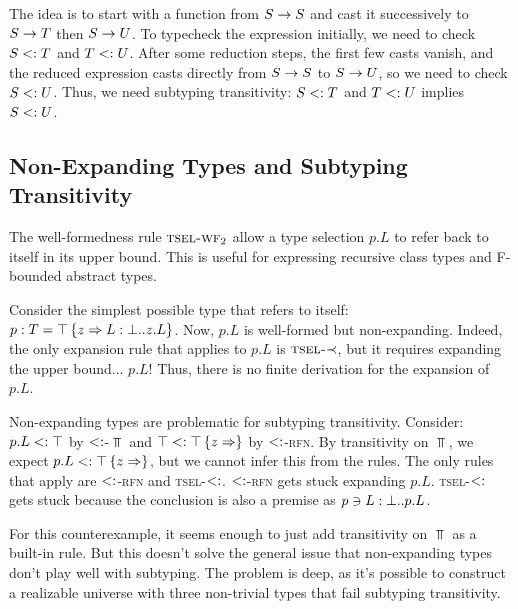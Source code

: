 \documentclass[preprint,9pt]{sigplanconf}
\begin{document}
The idea is to start with a function from $S \rightarrow S$ and cast it
successively to $S \rightarrow T$ then $S \rightarrow U$. To typecheck the
expression initially, we need to check $S <: T$ and $T <:
U$. After some reduction steps, the first few casts vanish, and the
reduced expression casts directly from $S \rightarrow S$ to $S \rightarrow U$, so
we need to check $S <: U$. Thus, we need subtyping transitivity: $S
<: T$ and $T <: U$ implies $S <: U$.

\subsection{Non-Expanding Types and Subtyping Transitivity}\label{nonexp}

The well-formedness rule $\textsc{tsel-wf$_2$}$ allow a type selection
$p.L$ to refer back to itself in its upper bound. This is useful for
expressing recursive class types and F-bounded abstract types.

Consider the simplest possible type that refers to itself: $p : T =
\top \left\{z \Rightarrow L : \bot..z.L \right\}$. Now, $p.L$ is well-formed but
non-expanding. Indeed, the only expansion rule that applies to $p.L$
is $\textsc{tsel-$\prec$}$, but it requires expanding the upper
bound... $p.L$! Thus, there is no finite derivation for the expansion
of $p.L$.

Non-expanding types are problematic for subtyping
transitivity. Consider: $p.L <: \top$ by \textsc{$<:$-$\Top$} and
$\top <: \top \left\{z \Rightarrow  \right\}$ by \textsc{$<:$-rfn}. By transitivity
on $\Top$, we expect $p.L <: \top \left\{z \Rightarrow  \right\}$, but we cannot infer
this from the rules. The only rules that apply are \textsc{$<:$-rfn}
and \textsc{tsel-$<:$}. \textsc{$<:$-rfn} gets stuck expanding
$p.L$. \textsc{tsel-$<:$} gets stuck because the conclusion is also
a premise as $p \ni L : \bot..p.L$.

For this counterexample, it seems enough to just add transitivity on
$\Top$ as a built-in rule. But this doesn't solve the general issue
that non-expanding types don't play well with subtyping. The problem
is deep, as it's possible to construct a realizable universe with
three non-trivial types that fail subtyping transitivity.
\end{document}
